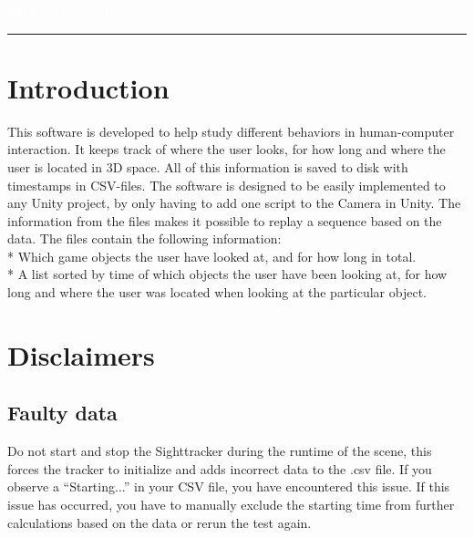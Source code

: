 \documentclass[letterpaper]{article}
\author{%
    Halse, Douglas \\
    Karlsson, Mattias \\
    Larsson, Johan \\
    Persson, Hannes \\
    Östmo, Marcus \\
    }
\makeatletter
\def\printauthor{%
    {\large \@author}}
\makeatother
\begin{document}
\begin{titlepage}
\BgThispage
{}
\vspace*{2cm}
\noindent
\textcolor{white}{\bigsf Sight tracking in Unity}
\vspace*{2.5cm}\par
\noindent
\begin{minipage}{0.35\linewidth}
    \begin{flushright}
        \printauthor
    \end{flushright}
\end{minipage} \hspace{15pt}
%
\begin{minipage}{0.02\linewidth}
    \rule{1pt}{175pt}
\end{minipage} \hspace{-10pt}
%
\begin{minipage}{0.6\linewidth}
\vspace{-2in}
\end{minipage}
\end{titlepage}
\restoregeometry
\tableofcontents
\newpage
\section{Introduction}
This software is developed to help study different behaviors in human-computer interaction. It keeps track of where the user looks, for how long and where the user is located in 3D space. All of this information is saved to disk with timestamps in CSV-files. The software is designed to be easily implemented to any Unity project, by only having to add one script to the Camera in Unity. The information from the files makes it possible to replay a sequence based on the data.
The files contain the following information:\\
* Which game objects the user have looked at, and for how long in total.\\
* A list sorted by time of which objects the user have been looking at, for how long and where the user was located when looking at the particular object.
\newpage
\section{Disclaimers}
\subsection{Faulty data}
Do not start and stop the Sighttracker during the runtime of the scene, this forces the tracker to initialize and adds incorrect data to the .csv file. If you observe a “Starting...” in your CSV file, you have encountered this issue. If this issue has occurred, you have to manually exclude the starting time from further calculations based on the data or rerun the test again.
\end{document}

